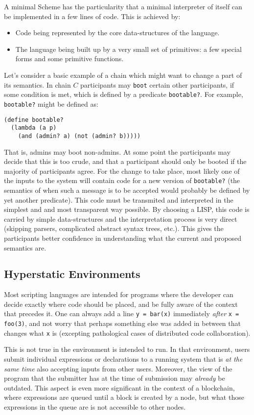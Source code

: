 A minimal Scheme has the particularity that a minimal interpreter of itself can
be implemented in a few lines of code. This is achieved by:
\begin{itemize}
  \item Code being represented by the core data-structures of the language.
  \item The language being built up by a very small set of primitives: a few
    special forms and some primitive functions.
\end{itemize}
Let's consider a basic example of a chain which might want to change a part of
its semantics. In chain $C$ participants may \texttt{boot} certain other
participants, if some condition is met, which is defined by a predicate
\texttt{bootable?}. For example, \texttt{bootable?} might be defined as:
\begin{verbatim}
(define bootable?
  (lambda (a p)
    (and (admin? a) (not (admin? b)))))
\end{verbatim}
That is, admins may boot non-admins. At some point the participants may decide
that this is too crude, and that a participant should only be booted if the
majority of participants agree. For the change to take place, most likely one of
the inputs to the system will contain code for a new version of
\texttt{bootable?} (the semantics of when such a message is to be accepted would
probably be defined by yet another predicate). This code must be transmited and
interpreted in the simplest and and most transparent way possible. By choosing a LISP,
this code is carried by simple data-structures and the interpretation process is
very direct (skipping parsers, complicated abstract syntax trees, etc.). This
gives the participants better confidence in understanding what the current and
proposed semantics are.

\subsection{Hyperstatic Environments}
\label{s:hyperstatic}

Most scripting languages are intended for programs where the developer can
decide exactly where code should be placed, and be fully aware of the context
that precedes it. One can always add a line \texttt{y = bar(x)} immediately
\emph{after} \texttt{x = foo(3)}, and not worry that perhaps something else was
added in between that changes what \texttt{x} is (excepting pathological cases
of distributed code collaboration).

This is not true in the environment \rad is intended to run. In that
environment, users submit individual expressions or declarations to a running
system that is \emph{at the same time} also accepting inputs from other
users. Moreover, the view of the program that the submitter has at the time of
submission may \emph{already} be outdated. This aspect is even more significant
in the context of a blockchain, where expressions are queued until a block is
created by a node, but what those expressions in the queue are is not
accessible to other nodes.

